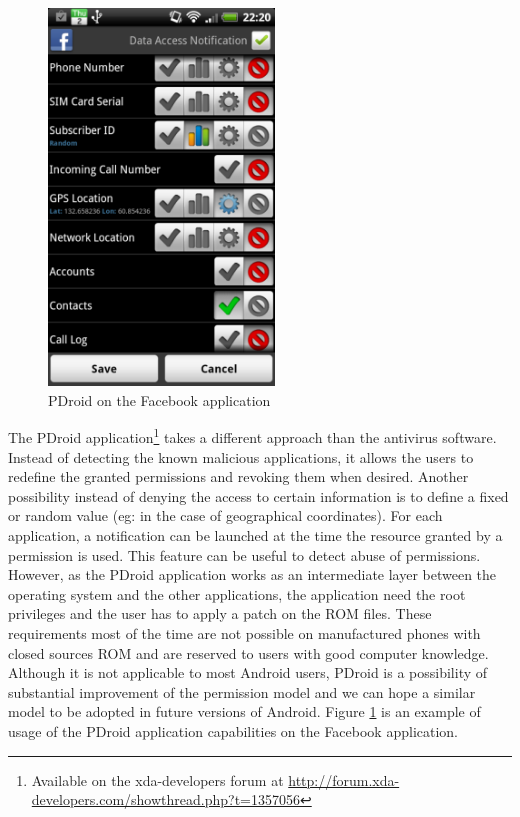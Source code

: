 \begin{figure}[h]
  \centering
  \includegraphics[width=6cm]{images/pdroid.png}
  \caption{PDroid on the Facebook application}
  \label{fig:pdroid}
\end{figure}


The PDroid application\footnote{Available on the xda-developers forum at \url{http://forum.xda-developers.com/showthread.php?t=1357056}} takes a different approach than the antivirus software.
Instead of detecting the known malicious applications, it allows the users to redefine the granted permissions and revoking them when desired.
Another possibility instead of denying the access to certain information is to define a fixed or random value (eg: in the case of geographical coordinates).
For each application, a notification can be launched at the time the resource granted by a permission is used.
This feature can be useful to detect abuse of permissions.
However, as the PDroid application works as an intermediate layer between the operating system and the other applications, the application need the root privileges and the user has to apply a patch on the ROM files.
These requirements most of the time are not possible on manufactured phones with closed sources ROM and are reserved to users with good computer knowledge.
Although it is not applicable to most Android users, PDroid is a possibility of substantial improvement of the permission model and we can hope a similar model to be adopted in future versions of Android.
Figure \ref{fig:pdroid} is an example of usage of the PDroid application capabilities on the Facebook application.


